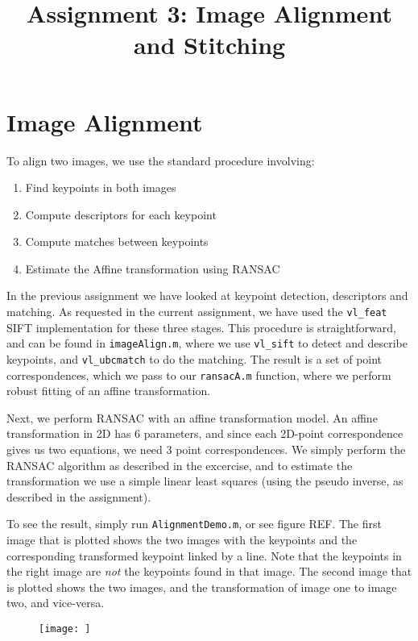 \documentclass[a4paper,10pt]{article}
\title{Assignment 3: Image Alignment and Stitching}
\author{}
\begin{document}
\maketitle

\section{Image Alignment}

To align two images, we use the standard procedure involving:
\begin{enumerate}
 \item Find keypoints in both images
 \item Compute descriptors for each keypoint
 \item Compute matches between keypoints
 \item Estimate the Affine transformation using RANSAC
\end{enumerate}

In the previous assignment we have looked at keypoint detection, descriptors and matching.
As requested in the current assignment, we have used the \verb+vl_feat+ SIFT implementation for these three stages.
This procedure is straightforward, and can be found in \verb+imageAlign.m+, where we use \verb+vl_sift+ to detect and describe keypoints,
and \verb+vl_ubcmatch+ to do the matching.
The result is a set of point correspondences, which we pass to our \verb+ransacA.m+ function, where we perform robust fitting of an affine transformation.

Next, we perform RANSAC with an affine transformation model.
An affine transformation in 2D has $6$ parameters, and since each 2D-point correspondence gives us two equations, we need 3 point correspondences.
We simply perform the RANSAC algorithm as described in the excercise, and to estimate the transformation we use a simple linear least squares (using the pseudo inverse, as described in the assignment).

To see the result, simply run \verb+AlignmentDemo.m+, or see figure REF.
The first image that is plotted shows the two images with the keypoints and the corresponding transformed keypoint linked by a line.
Note that the keypoints in the right image are \emph{not} the keypoints found in that image.
The second image that is plotted shows the two images, and the transformation of image one to image two, and vice-versa.

\begin{figure}

\texttt{[image: ]}

\end{figure}
\end{document}
